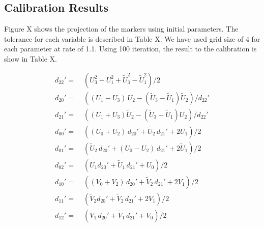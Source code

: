 \subsection{Calibration Results}

Figure X shows the projection of the markers using initial parameters.  The tolerance for each variable is described in Table X.  We have used grid size of 4 for each parameter at rate of 1.1.  Using 100 iteration, the result to the calibration is show in Table X.

\begin{equation}\label{eq:d_coeff}
\begin{split}
d_{22}' =& \; (U_3^2 - U_1^2 + \tilde{U}_3^2 - \tilde{U}_1^2)/2 \\
d_{20}' =& \; ((U_1 - U_3)\,U_2 - (\tilde{U}_3 - \tilde{U}_1)\tilde{U}_2)/d_{22}' \\
d_{21}' =& \; ((U_1 + U_3)\tilde{U}_2 - (\tilde{U}_3 + \tilde{U}_1) U_2)/ d_{22}' \\
d_{00}' =& \; ((U_0 + U_2)\,d_{20}' + \tilde{U}_2 \, d_{21}' + 2 U_1)/2 \\
d_{01}' =& \; (\tilde{U}_2 \, d_{20}' + (U_0 - U_2)\, d_{21}' + 2 \tilde{U}_1)/2  \\
d_{02}' =& \; (U_1 d_{20}' + \tilde{U}_1 \, d_{21}' + U_0)/2 \\
d_{10}' =& \; ( (V_0 + V_2) \, d_{20}' + \tilde{V}_2 \, d_{21}' + 2 V_1 )/2 \\
d_{11}' =& \; (\tilde{V}_2 d_{20}' + \tilde{V}_2 \, d_{21}' + 2 V_1)/2 \\
d_{12}' =& \; (V_1 \, d_{20}' + \tilde{V}_1 \, d_{21}' + V_0)/2   \\
\end{split}
\end{equation}


